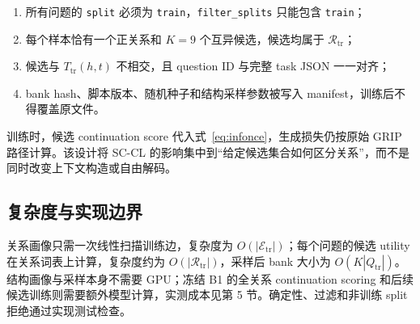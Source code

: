 \begin{enumerate}
    \item 所有问题的 \texttt{split} 必须为 \texttt{train}，\texttt{filter\_splits} 只能包含 \texttt{train}；
    \item 每个样本恰有一个正关系和 $K=9$ 个互异候选，候选均属于 $\mathcal{R}_{\mathrm{tr}}$；
    \item 候选与 $T_{\mathrm{tr}}(h,t)$ 不相交，且 question ID 与完整 task JSON 一一对齐；
    \item bank hash、脚本版本、随机种子和结构采样参数被写入 manifest，训练后不得覆盖原文件。
\end{enumerate}

训练时，候选 continuation score 代入式~\ref{eq:infonce}，生成损失仍按原始 GRIP 路径计算。该设计将 SC-CL 的影响集中到“给定候选集合如何区分关系”，而不是同时改变上下文构造或自由解码。

\subsection{复杂度与实现边界}

关系画像只需一次线性扫描训练边，复杂度为 $O(|\mathcal{E}_{\mathrm{tr}}|)$；每个问题的候选 utility 在关系词表上计算，复杂度约为 $O(|\mathcal{R}_{\mathrm{tr}}|)$，采样后 bank 大小为 $O(K|Q_{\mathrm{tr}}|)$。结构画像与采样本身不需要 GPU；冻结 B1 的全关系 continuation scoring 和后续候选训练则需要额外模型计算，实测成本见第 5 节。确定性、过滤和非训练 split 拒绝通过实现测试检查。
